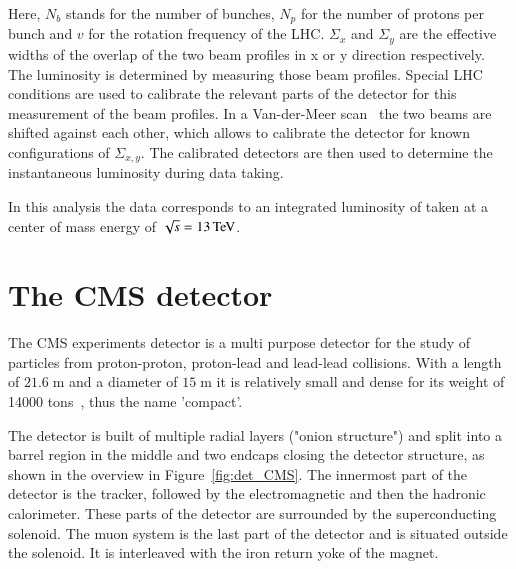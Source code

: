 Here, $N_b$ stands for the number of bunches, $N_p$ for the number of protons per bunch and $v$ for the rotation frequency of the LHC.
$\Sigma_x$ and $\Sigma_y$ are the effective widths of the overlap of the two beam profiles in x or y direction respectively. The luminosity is determined by measuring those beam profiles.
Special LHC conditions are used to calibrate the relevant parts of the detector for this measurement of the beam profiles. In a Van-der-Meer scan~\cite{Zanetti:1357856} the two beams are shifted against each other, which allows to calibrate the detector for known configurations of $\Sigma_{x,y}$.
The calibrated detectors are then used to determine the instantaneous luminosity during data taking. 

In this analysis the data corresponds to an integrated luminosity of \lumivwunc taken at a center of mass energy of $\sqrt{s} = 13 \,\text{Te\hspace{-.08em}V}$.

\section{The CMS detector}

The CMS experiments detector is a multi purpose detector for the study of particles from proton-proton, proton-lead and lead-lead collisions.
With a length of $21.6 \;\si{\meter}$ and a  diameter of $15 \;\si{\meter}$ it is relatively small and dense for its weight of 14000 tons~\cite{Bayatian:922757}, thus the name 'compact'.

The detector is built of multiple radial layers ("onion structure") and split into a barrel region in the middle and two endcaps closing the detector structure, as shown in the overview in Figure~\ref{fig:det_CMS}.
The innermost part of the detector is the tracker, followed by the electromagnetic and then the hadronic calorimeter.
These parts of the detector are surrounded by the superconducting solenoid. The muon system is the last part of the detector and is situated outside the solenoid. It is interleaved with the iron return yoke of the magnet.

